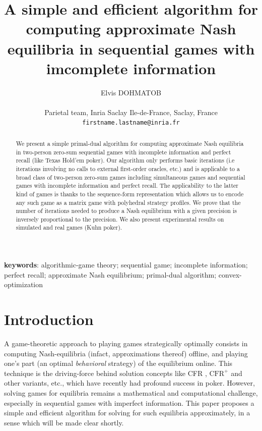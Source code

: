 \documentclass{article} %
\title{
  A simple and efficient algorithm for computing approximate
  Nash equilibria in sequential games with imcomplete
  information}
\author{Elvis DOHMATOB%
\\\\Parietal team, Inria Saclay Ile-de-France, Saclay, France
\\\texttt{firstname.lastname@inria.fr}
}
\begin{document}
\maketitle
\begin{abstract}We present a simple primal-dual algorithm for
  computing approximate Nash equilibria in two-person zero-sum
  sequential games with  incomplete information and perfect recall
  (like Texas Hold'em poker). Our algorithm only performs basic
  iterations (i.e iterations involving no calls to external
  first-order oracles, etc.)
  and is applicable to a broad class of two-person zero-sum games
  including simultaneous games and sequential games with incomplete
  information and perfect recall. The applicability to the latter kind
  of games is thanks to the sequence-form representation
  \cite{koller1992complexity} which allows us to encode any such game
  as a matrix game with polyhedral strategy profiles. We prove that
  the number of iterations needed to produce a Nash equilibrium with a
  given precision is inversely proportional to the
  precision. We also present experimental results on simulated and
  real games (Kuhn poker).
\end{abstract}

\textbf{keywords}: algorithmic-game theory; sequential game;
incomplete information; perfect recall; approximate Nash equilibrium;
primal-dual algorithm; convex-optimization

\section{Introduction}
\label{sec:intro}
A game-theoretic approach to playing games strategically optimally
consists in computing Nash-equilibria (infact, approximations thereof)
offline, and playing one's part (an optimal \textit{behavioral}
strategy) of the equilibrium online. This
technique is the driving-force behind solution concepts like CFR
\cite{zinkevich2008regret,lanctot2009monte,Bowling09012015},
$\text{CFR}^{+}$ \cite{tammelin14} and other variants, etc., which
have recently had profound success in poker. However, solving games
for equilibria remains a mathematical and computational challenge,
especially in sequential games with imperfect information. This paper
proposes a simple and efficient algorithm for solving for such
equilibria approximately, in a sense which will be made clear shortly.
\end{document}
